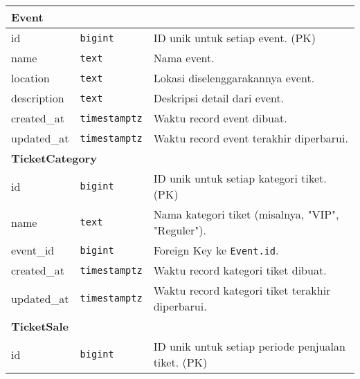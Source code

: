 \begin{longtable}{|l|p{}|p{}|}
	\hline
	\multicolumn{3}{|l|}{\textbf{Event}}                                                                                                \\
	\hline
	id                   & \texttt{bigint}       & ID unik untuk setiap event. (PK)                                                     \\
	\hline
	name                 & \texttt{text}         & Nama event.                                                                          \\
	\hline
	location             & \texttt{text}         & Lokasi diselenggarakannya event.                                                     \\
	\hline
	description          & \texttt{text}         & Deskripsi detail dari event.                                                         \\
	\hline
	created\_at          & \texttt{timestamptz}  & Waktu record event dibuat.                                                           \\
	\hline
	updated\_at          & \texttt{timestamptz}  & Waktu record event terakhir diperbarui.                                              \\
	\hline
	\multicolumn{3}{|l|}{\textbf{TicketCategory}}                                                                                       \\
	\hline
	id                   & \texttt{bigint}       & ID unik untuk setiap kategori tiket. (PK)                                            \\
	\hline
	name                 & \texttt{text}         & Nama kategori tiket (misalnya, "VIP", "Reguler").                                    \\
	\hline
	event\_id            & \texttt{bigint}       & Foreign Key ke \texttt{Event.id}.                                                    \\
	\hline
	created\_at          & \texttt{timestamptz}  & Waktu record kategori tiket dibuat.                                                  \\
	\hline
	updated\_at          & \texttt{timestamptz}  & Waktu record kategori tiket terakhir diperbarui.                                     \\
	\hline
	\multicolumn{3}{|l|}{\textbf{TicketSale}}                                                                                           \\
	\hline
	id                   & \texttt{bigint}       & ID unik untuk setiap periode penjualan tiket. (PK)                                   \\

\end{longtable}
